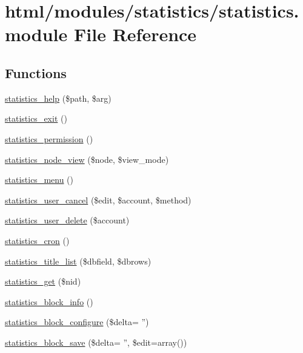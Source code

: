 \hypertarget{statistics_8module}{
\section{html/modules/statistics/statistics.module File Reference}
\label{statistics_8module}
}
\subsection*{Functions}
\begin{DoxyCompactItemize}
\item 
\hyperlink{statistics_8module_acd06f51782dd5b3b088970412c3480f5}{statistics\_\-help} (\$path, \$arg)
\item 
\hyperlink{statistics_8module_a202ea07bc132a6ca79372feb436b3079}{statistics\_\-exit} ()
\item 
\hyperlink{statistics_8module_ac907dfbe126a841baf3b9c42d450a20f}{statistics\_\-permission} ()
\item 
\hyperlink{statistics_8module_aea42e870ef6f9238a3ebd9e0557ce0d7}{statistics\_\-node\_\-view} (\$node, \$view\_\-mode)
\item 
\hyperlink{statistics_8module_ad975827a39ea4d5986fc6ce1756cce34}{statistics\_\-menu} ()
\item 
\hyperlink{statistics_8module_a349d206ce12f9119bba057360741867d}{statistics\_\-user\_\-cancel} (\$edit, \$account, \$method)
\item 
\hyperlink{statistics_8module_a36563f2a6c0c1878b8f8f835536ed3af}{statistics\_\-user\_\-delete} (\$account)
\item 
\hyperlink{statistics_8module_af9e6a4f423aee26c65a1d9acb69c3a96}{statistics\_\-cron} ()
\item 
\hyperlink{statistics_8module_a1c03906824bea12cc22348f58d6a1531}{statistics\_\-title\_\-list} (\$dbfield, \$dbrows)
\item 
\hyperlink{statistics_8module_a30aa1d647f1ff4c72d1ff5daf5af893b}{statistics\_\-get} (\$nid)
\item 
\hyperlink{statistics_8module_a1c81f45147184c934466f8359761f91f}{statistics\_\-block\_\-info} ()
\item 
\hyperlink{statistics_8module_a54467449f7ad4e5a97345cf740088189}{statistics\_\-block\_\-configure} (\$delta= '')
\item 
\hyperlink{statistics_8module_a1a71da55c633b8226c93ddb71fa8af5f}{statistics\_\-block\_\-save} (\$delta= '', \$edit=array())
\item 

\end{DoxyCompactItemize}
